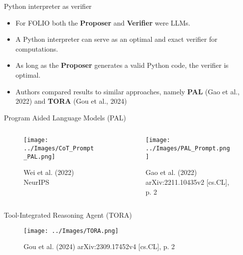 \documentclass{beamer}
\begin{document}
\begin{frame}{Python interpreter as verifier}
    \begin{itemize}
        \item For FOLIO both the \textbf{Proposer} and \textbf{Verifier} were LLMs.
        \item A Python interpreter can serve as an optimal and exact verifier for computations.
        \item As long as the \textbf{Proposer} generates a valid Python code, the verifier is optimal.
        \item Authors compared results to similar approaches, namely \textbf{PAL} (Gao et al., 2022) and \textbf{TORA} (Gou et al., 2024)
    \end{itemize}
\end{frame}

\begin{frame}{Program Aided Language Models (PAL)}
    \begin{columns}
        \begin{column}{0.5\textwidth}
            \begin{figure}
                \centering
                \texttt{[image: ../Images/CoT\_Prompt\_PAL.png]}

                \vspace{0.2em}
                {\tiny Wei et al. (2022) NeurIPS}
            \end{figure}
        \end{column}
        \begin{column}{0.5\textwidth}
            \begin{figure}
                \centering
                \texttt{[image: ../Images/PAL\_Prompt.png]}

                \vspace{0.2em}
                {\tiny Gao et al. (2022) arXiv:2211.10435v2 [cs.CL], p. 2}
            \end{figure}
        \end{column}
    \end{columns}
\end{frame}

\begin{frame}{Tool-Integrated Reasoning Agent (TORA)}
    \begin{figure}
        \centering
        \texttt{[image: ../Images/TORA.png]}

        \vspace{0.2em}
        {\tiny Gou et al. (2024) arXiv:2309.17452v4 [cs.CL], p. 2}
    \end{figure}
\end{frame}
\end{document}
